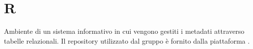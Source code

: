 \section{R}

Ambiente di un sistema informativo in cui vengono gestiti i metadati attraverso
tabelle relazionali. Il repository utilizzato dal gruppo \zephyrus{} è fornito
dalla piattaforma .